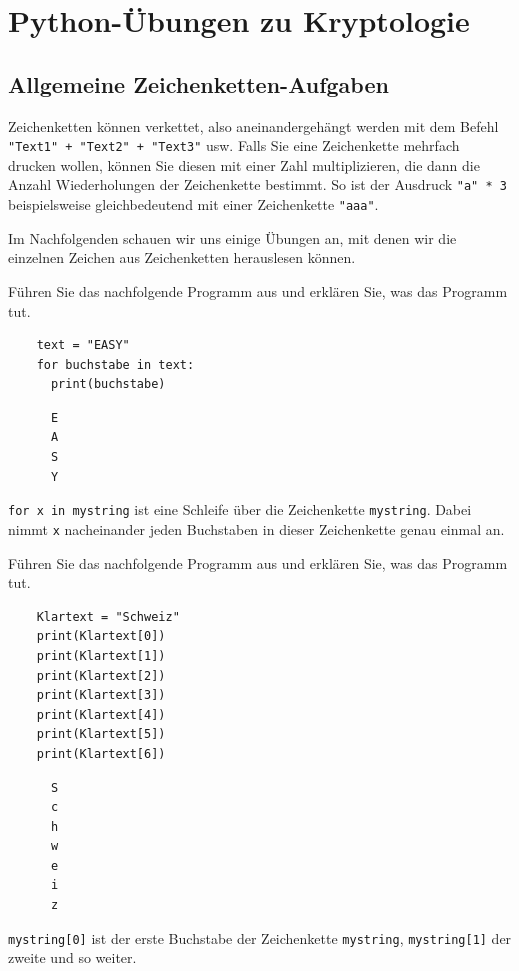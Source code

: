 \chapter{Python-Übungen zu Kryptologie}\label{ch:Kryptologie}

\section{Allgemeine Zeichenketten-Aufgaben}
Zeichenketten können verkettet, also aneinandergehängt werden mit dem Befehl \lstinline|"Text1" + "Text2" + "Text3"| usw. Falls Sie eine Zeichenkette mehrfach drucken wollen, können Sie diesen mit einer Zahl multiplizieren, die dann die Anzahl Wiederholungen der Zeichenkette bestimmt. So ist der Ausdruck \lstinline|"a" * 3| beispielsweise gleichbedeutend mit einer Zeichenkette \lstinline|"aaa"|.

Im Nachfolgenden schauen wir uns einige Übungen an, mit denen wir die einzelnen Zeichen aus Zeichenketten herauslesen können.

\begin{myexercise}
	Führen Sie das nachfolgende Programm aus und erklären Sie, was das Programm tut.
	\begin{lstlisting}
    text = "EASY"
    for buchstabe in text:
      print(buchstabe)
  \end{lstlisting}
	\begin{myanswer}
		\begin{lstlisting}
      E
      A
      S
      Y
    \end{lstlisting}
		\lstinline|for x in mystring| ist eine Schleife über die Zeichenkette \lstinline|mystring|. Dabei nimmt \lstinline|x| nacheinander jeden Buchstaben in dieser Zeichenkette genau einmal an.
	\end{myanswer}
\end{myexercise}

\begin{myexercise}\label{myexercise:index}
	Führen Sie das nachfolgende Programm aus und erklären Sie, was das Programm tut.
	\begin{lstlisting}
    Klartext = "Schweiz"
    print(Klartext[0])
    print(Klartext[1])
    print(Klartext[2])
    print(Klartext[3])
    print(Klartext[4])
    print(Klartext[5])
    print(Klartext[6])
  \end{lstlisting}
	\begin{myanswer}
		\begin{lstlisting}
      S
      c
      h
      w
      e
      i
      z
    \end{lstlisting}
		\lstinline|mystring[0]| ist der erste Buchstabe der Zeichenkette \lstinline|mystring|, \lstinline|mystring[1]| der zweite und so weiter.
	\end{myanswer}
\end{myexercise}

